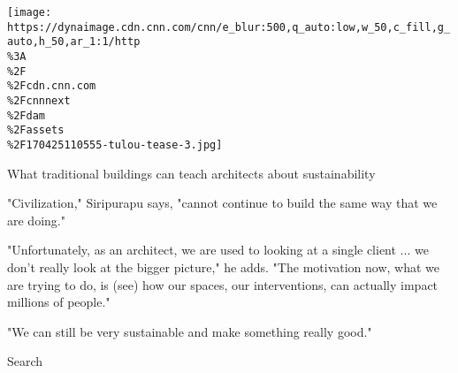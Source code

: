 \href{/style/article/vernacular-architecture-sustainability/index.html}{}

\texttt{[image: https://dynaimage.cdn.cnn.com/cnn/e\_blur:500,q\_auto:low,w\_50,c\_fill,g\_auto,h\_50,ar\_1:1/http\\\%3A\\\%2F\\\%2Fcdn.cnn.com\\\%2Fcnnnext\\\%2Fdam\\\%2Fassets\\\%2F170425110555-tulou-tease-3.jpg]}

What traditional buildings can teach architects about sustainability

"Civilization," Siripurapu says, "cannot continue to build the same way
that we are doing."

"Unfortunately, as an architect, we are used to looking at a single
client ... we don't really look at the bigger picture," he adds. "The
motivation now, what we are trying to do, is (see) how our spaces, our
interventions, can actually impact millions of people."

"We can still be very sustainable and make something really good."

Search

